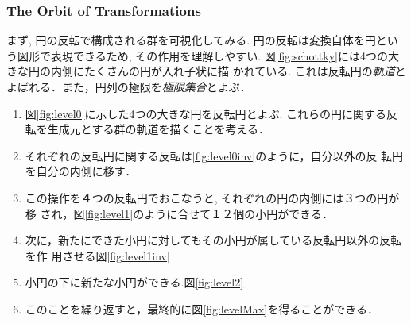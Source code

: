 \subsubsection{The Orbit of Transformations}

まず, 円の反転で構成される群を可視化してみる.
円の反転は変換自体を円という図形で表現できるため, その作用を理解しやすい.
図\ref{fig:schottky}には4つの大きな円の内側にたくさんの円が入れ子状に描
かれている.
これは反転円の\emph{軌道}とよばれる．また，円列の極限を\emph{極限集合}とよぶ．

\begin{enumerate}
 \item 図\ref{fig:level0}に示した4つの大きな円を反転円とよぶ.
       これらの円に関する反転を生成元とする群の軌道を描くことを考える．
 \item それぞれの反転円に関する反転は\ref{fig:level0inv}のように，自分以外の反
       転円を自分の内側に移す．
 \item この操作を４つの反転円でおこなうと, それぞれの円の内側には３つの円が移
       され，図\ref{fig:level1}のように合せて１２個の小円ができる．
 \item 次に，新たにできた小円に対してもその小円が属している反転円以外の反転を作
       用させる図\ref{fig:level1inv}
 \item 小円の下に新たな小円ができる.図\ref{fig:level2}
 \item このことを繰り返すと，最終的に図\ref{fig:levelMax}を得ることができる．
\end{enumerate}

